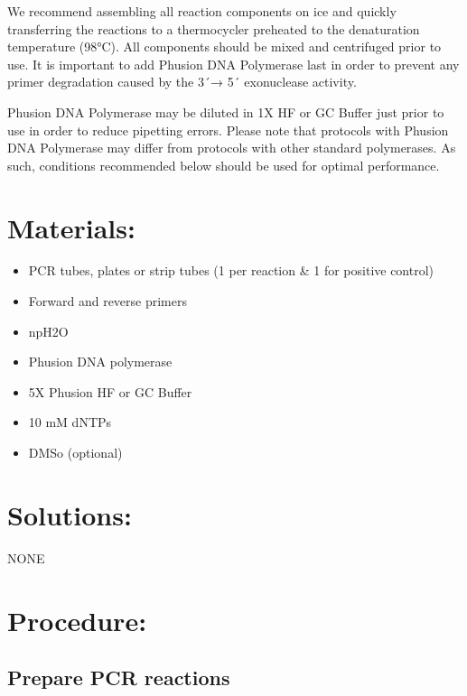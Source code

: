 \documentclass[
  letterpaper,
  DIV=11,
  numbers=noendperiod]{scrreprt}
\providecommand{\tightlist}{%
  \setlength{\itemsep}{0pt}\setlength{\parskip}{0pt}}\usepackage{longtable,booktabs,array}
\begin{document}
We recommend assembling all reaction components on ice and quickly
transferring the reactions to a thermocycler preheated to the
denaturation temperature (98°C). All components should be mixed and
centrifuged prior to use. It is important to add Phusion DNA Polymerase
last in order to prevent any primer degradation caused by the 3´→ 5´
exonuclease activity.

Phusion DNA Polymerase may be diluted in 1X HF or GC Buffer just prior
to use in order to reduce pipetting errors. Please note that protocols
with Phusion DNA Polymerase may differ from protocols with other
standard polymerases. As such, conditions recommended below should be
used for optimal performance.

\hypertarget{materials}{%
\section{Materials:}\label{materials}}

\begin{itemize}
\tightlist
\item
  PCR tubes, plates or strip tubes (1 per reaction \& 1 for positive
  control)
\item
  Forward and reverse primers
\item
  npH2O
\item
  Phusion DNA polymerase
\item
  5X Phusion HF or GC Buffer
\item
  10 mM dNTPs
\item
  DMSo (optional)
\end{itemize}

\hypertarget{solutions}{%
\section{Solutions:}\label{solutions}}

NONE

\hypertarget{procedure}{%
\section{Procedure:}\label{procedure}}

\hypertarget{prepare-pcr-reactions}{%
\subsection{Prepare PCR reactions}\label{prepare-pcr-reactions}}
\end{document}
